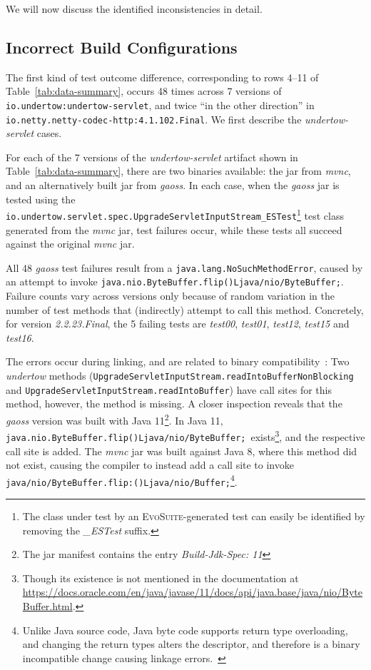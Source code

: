 \documentclass[conference]{IEEEtran}
\makeatletter
\newcommand{\evosuite}{\textsc{EvoSuite}\@\xspace}
\makeatother
\begin{document}
We will now discuss the identified inconsistencies in detail.

\subsection{Incorrect Build Configurations}


The first kind of test outcome difference, corresponding to rows 4--11 of Table~\ref{tab:data-summary}, occurs 48 times across 7 versions of \texttt{io.undertow:undertow-servlet}, and twice ``in the other direction'' in \texttt{io.netty.netty-codec-http:4.1.102.Final}.
We first describe the \textit{undertow-servlet} cases.

For each of the 7 versions of the \textit{undertow-servlet} artifact shown in Table~\ref{tab:data-summary}, there are two binaries available: the jar from \textit{mvnc}, and an alternatively built jar from \textit{gaoss}. In each case, when the \textit{gaoss} jar is tested using the \texttt{io.under\-tow.\-servlet.\-spec.UpgradeServletInputStream\_ESTest}\footnote{The class under test by an \evosuite-generated test can easily be identified by removing the \textit{\_ESTest} suffix.} test class generated from the \textit{mvnc} jar, test failures occur, while these tests all succeed against the original \textit{mvnc} jar.

All 48 \textit{gaoss} test failures result from a \texttt{java.lang.NoSuchMethodError}, caused by an attempt to invoke \texttt{java.nio.ByteBuffer.flip()Ljava/nio/ByteBuffer;}.
Failure counts vary across versions only because of random variation in the number of test methods that (indirectly) attempt to call this method.
Concretely, for version \textit{2.2.23.Final}, the 5 failing tests are \textit{test00}, \textit{test01}, \textit{test12}, \textit{test15} and \textit{test16}.

The errors occur during linking, and are related to binary compatibility~\cite{JVM17Spec}: Two \textit{undertow} methods (\texttt{UpgradeServletInputStream.readIntoBufferNonBlocking} and \texttt{UpgradeServletInputStream.readIntoBuffer}) have call sites for this method, however, the method is missing. 
A closer inspection reveals that the \textit{gaoss} version was built with Java 11\footnote{The jar manifest contains the entry \textit{Build-Jdk-Spec: 11}}. In Java 11, \texttt{java.nio.\-ByteBuffer.flip()Ljava/nio/ByteBuffer;}~exists\footnote{Though its existence is not mentioned in the documentation at \url{https://docs.oracle.com/en/java/javase/11/docs/api/java.base/java/nio/ByteBuffer.html}.}, and the respective call site is added. The \textit{mvnc} jar was built against Java 8, where this method did not exist, causing the compiler to instead add a call site to invoke \texttt{java/\-nio/ByteBuffer.flip:()Ljava/nio/Buffer;}\footnote{Unlike Java source code, Java byte code supports return type overloading, and changing the return types alters the descriptor, and therefore is a binary incompatible change causing linkage errors.~\cite{JVM17Spec,dietrich2014broken}}.
\end{document}

